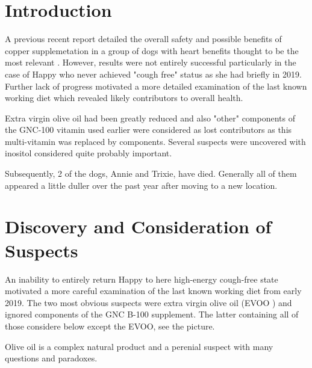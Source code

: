 
\begin{abstract}


\end{abstract}

\maketitle
\tableofcontents
\newpage


\section{Introduction  }

A previous recent report detailed the overall safety and
possible benefits of copper supplemetation in a group of dogs
with heart benefits thought to be the most relevant
\cite{marchywka-MJM-2024-010-0.01rg} .
However, results were not entirely successful particularly in the
case of Happy who never achieved "cough free" status as
she had briefly in 2019. Further lack of progress
motivated a more detailed
examination of the last known working diet which revealed
likely contributors to overall health. 


Extra virgin olive oil
had been greatly reduced and also "other" components of the
GNC-100 vitamin used earlier were considered as lost contributors
as this multi-vitamin was replaced by components. Several suspects
were uncovered with inositol considered quite probably important.  

Subsequently, 2 of the dogs, Annie and Trixie,  have died.
Generally all of them appeared a little duller over the past year
after moving to a new location.

\section{ Discovery and Consideration of Suspects }

An inability to entirely return Happy to here high-energy cough-free
state motivated a more careful examination of the last known working
diet from early 2019. The two most obvious suspects were extra
virgin olive oil (EVOO ) and ignored components of the GNC B-100
supplement. The latter containing all of those considere below except
the EVOO, see the picture.  


Olive oil is a complex natural product and a perenial suspect 
with many questions and paradoxes.

